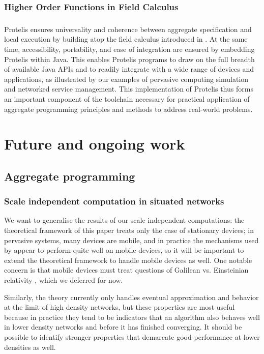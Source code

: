 \documentclass[12pt,a4paper,twoside,openright]{book}
\begin{document}
\subsection{Higher Order Functions in Field Calculus}

\subsection{\protelis{}}
Protelis ensures universality and coherence between aggregate specification and local execution by building atop the field calculus introduced in \cite{VDB-FOCLASA-CIC2013}.
%
At the same time, accessibility, portability, and ease of integration are ensured by embedding Protelis within Java.
%
This enables Protelis programs to draw on the full breadth of available Java APIs and to readily integrate with a wide range of devices and applications, as illustrated by our examples of pervasive computing simulation and networked service management.
%
This implementation of Protelis thus forms an important component of the toolchain necessary for practical application of aggregate programming principles and methods to address real-world problems.
%

\chapter{Future and ongoing work}

\section{Aggregate programming}

\subsection{Scale independent computation in situated networks}
We want to generalise the results of our scale independent computations: the theoretical framework of this paper treats only the case of stationary devices; in pervasive systems, many devices are mobile, and in practice the mechanisms used by \calculus{} appear to perform quite well on mobile devices, so it will be important to extend the theoretical framework
to handle mobile devices as well.
%
One notable concern is that mobile devices must treat questions of Galilean vs. Einsteinian relativity \cite{RelativityIntroduction}, which we deferred for now.

Similarly, the theory currently only handles eventual approximation and behavior at the limit of high density networks, but these properties are most useful because in practice they tend to be indicators that an algorithm also behaves well in lower density networks and before it has finished converging.  It should be possible to identify stronger properties that demarcate good performance at lower densities as well.
\end{document}
